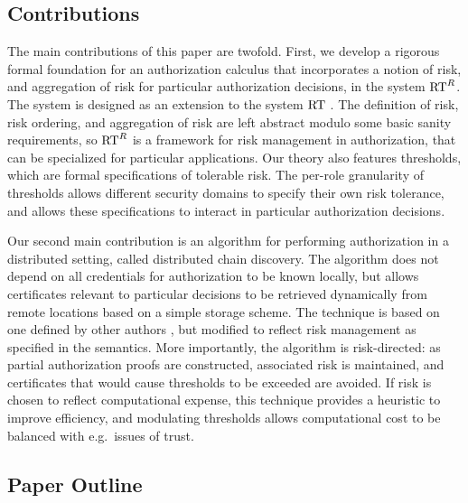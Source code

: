 \subsection{Contributions}

The main contributions of this paper are twofold.  First, we develop a
rigorous formal foundation for an authorization calculus that
incorporates a notion of risk, and aggregation of risk for particular
authorization decisions, in the system $\text{RT}^R$.  The system is designed
as an extension to the system $\text{RT}$ \cite{Li:2002-05}.  The definition
of risk, risk ordering, and aggregation of risk are left abstract
modulo some basic sanity requirements, so $\text{RT}^R$ is a framework for
risk management in authorization, that can be specialized for
particular applications.  Our theory also features thresholds, which
are formal specifications of tolerable risk.  The per-role granularity
of thresholds allows different security domains to specify their own
risk tolerance, and allows these specifications to interact in
particular authorization decisions.

Our second main contribution is an algorithm for performing
authorization in a distributed setting, called distributed chain
discovery.  The algorithm does not depend on all credentials for
authorization to be known locally, but allows certificates relevant to
particular decisions to be retrieved dynamically from remote locations
based on a simple storage scheme.  The technique is based on one
defined by other authors \cite{Li:2003-02}, but modified to reflect
risk management as specified in the semantics.  More importantly, the
algorithm is risk-directed: as partial authorization proofs are
constructed, associated risk is maintained, and certificates that
would cause thresholds to be exceeded are avoided.  If risk is chosen
to reflect computational expense, this technique provides a heuristic
to improve efficiency, and modulating thresholds allows computational
cost to be balanced with e.g.~issues of trust.


\subsection{Paper Outline}


